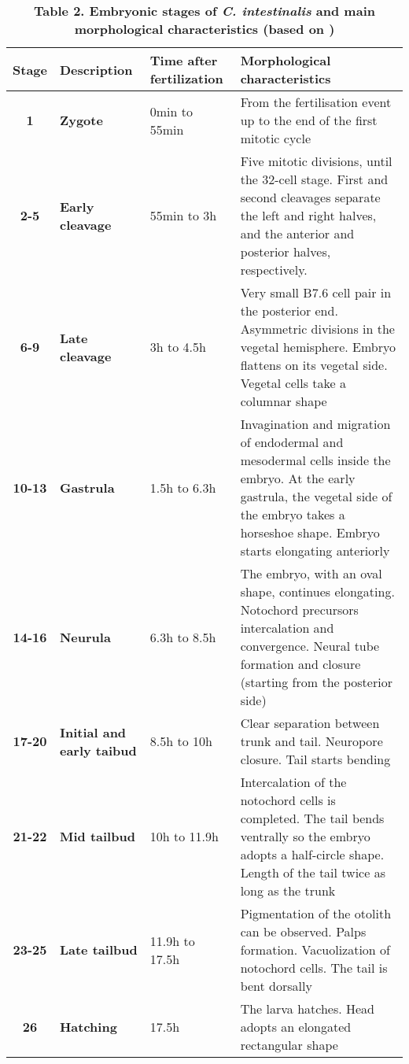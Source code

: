 \label{Table_Ciona}
\begin{sidewaystable}
    \centering

\caption*{\textbf{Table 2. Embryonic stages of \textit{C. intestinalis} and main morphological characteristics (based on \citealp{Hotta2007}) }}
\begin{tabular}{|c|p{3cm}|p{3cm}|p{10cm}|}
\hline
\textbf{Stage}&\textbf{Description}&\textbf{Time after fertilization}& \textbf{Morphological characteristics} \\
\hline
\textbf{1}	& \textbf{Zygote}		& 0min to 55min 	&	From the fertilisation event up to the end of the first mitotic cycle \\
%
\textbf{2-5}	& \textbf{Early cleavage}& 55min to 3h	& Five mitotic divisions, until the 32-cell stage. First and second cleavages separate the left and right halves, and the anterior and posterior halves, respectively.  
\\
%
\textbf{6-9}	& \textbf{Late cleavage}& 3h to 4.5h	& Very small B7.6 cell pair in the posterior end. Asymmetric divisions in the vegetal hemisphere. Embryo flattens on its vegetal side. Vegetal cells take a columnar shape\\
%
\textbf{10-13}	& \textbf{Gastrula}	& 1.5h to 6.3h	& Invagination and migration of endodermal and mesodermal cells inside the embryo. At the early gastrula, the vegetal side of the embryo takes a horseshoe shape. Embryo starts elongating anteriorly \\
%
\textbf{14-16}	& \textbf{Neurula}	& 6.3h to 8.5h	& The embryo, with an oval shape, continues elongating. Notochord precursors  intercalation and convergence. Neural tube formation and closure (starting from the posterior side)\\
%
\textbf{17-20}	& \textbf{Initial and early taibud}	& 8.5h to 10h	& Clear separation between trunk and tail. Neuropore closure. Tail starts bending \\
%
\textbf{21-22}	& \textbf{Mid tailbud}	& 10h to 11.9h	& Intercalation of the notochord cells is completed. The tail bends ventrally so the embryo adopts a half-circle shape. Length of the tail twice as long as the trunk	\\
%
\textbf{23-25}	& \textbf{Late tailbud}	& 11.9h to 17.5h 	& Pigmentation of the otolith can be observed. Palps formation. Vacuolization of notochord cells. The tail is bent dorsally   \\
%
\textbf{26}		& \textbf{Hatching}	& 17.5h 	& The larva hatches. Head adopts an elongated rectangular shape \\

\hline
\end{tabular}
\end{sidewaystable}

